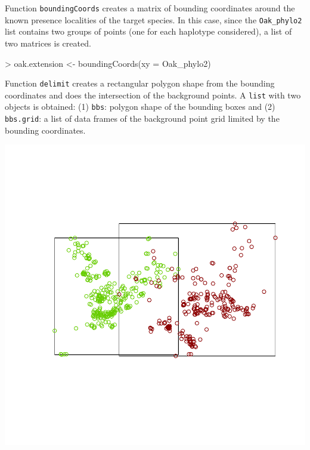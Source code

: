 \documentclass[10pt,a4paper]{article}
\begin{document}
Function \texttt{boundingCoords} creates a matrix of bounding coordinates around the known presence localities of the target species. In this case, since the \texttt{Oak\_phylo2} list contains two groups of points (one for each haplotype considered), a list of two matrices is created.

\begin{Schunk}
\begin{Sinput}
>  oak.extension <- boundingCoords(xy = Oak_phylo2)
\end{Sinput}
\end{Schunk}

Function \texttt{delimit} creates a rectangular polygon shape from the bounding coordinates and does the intersection of the background points. A \texttt{list} with two objects is obtained: (1) \texttt{bbs}: polygon shape of the bounding boxes and (2) \texttt{bbs.grid}: a list of data frames of the background point grid limited by the bounding coordinates.


\begin{Schunk}
\end{Schunk}
\includegraphics{mopa-mopa6}
\end{document}
